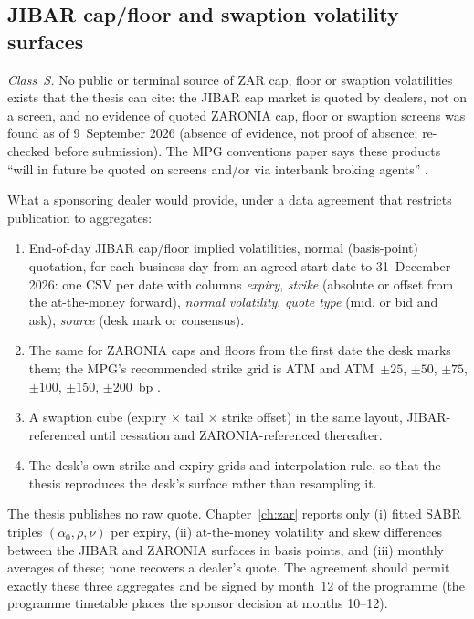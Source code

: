 
\subsection{JIBAR cap/floor and swaption volatility surfaces}\label{sec:appC-vols}

\emph{Class~S.} No public or terminal source of ZAR cap, floor or swaption volatilities exists that the thesis can cite: the JIBAR cap market is quoted by dealers, not on a screen, and no evidence of quoted ZARONIA cap, floor or swaption screens was found as of 9~September 2026 (absence of evidence, not proof of absence; re-checked before submission). The MPG conventions paper says these products ``will in future be quoted on screens and/or via interbank broking agents'' \citep[\S3, p.~5]{sarb2024conv}.

What a sponsoring dealer would provide, under a data agreement that restricts publication to aggregates:
\begin{enumerate}[nosep]
\item End-of-day JIBAR cap/floor implied volatilities, normal (basis-point) quotation, for each business day from an agreed start date to 31~December 2026: one CSV per date with columns \emph{expiry}, \emph{strike} (absolute or offset from the at-the-money forward), \emph{normal volatility}, \emph{quote type} (mid, or bid and ask), \emph{source} (desk mark or consensus).
\item The same for ZARONIA caps and floors from the first date the desk marks them; the MPG's recommended strike grid is ATM and ATM~$\pm25$, $\pm50$, $\pm75$, $\pm100$, $\pm150$, $\pm200$~bp \citep[\S7.6, p.~25]{sarb2024conv}.
\item A swaption cube (expiry $\times$ tail $\times$ strike offset) in the same layout, JIBAR-referenced until cessation and ZARONIA-referenced thereafter.
\item The desk's own strike and expiry grids and interpolation rule, so that the thesis reproduces the desk's surface rather than resampling it.
\end{enumerate}
The thesis publishes no raw quote. Chapter~\ref{ch:zar} reports only (i) fitted SABR triples $(\alpha_0,\rho,\nu)$ per expiry, (ii) at-the-money volatility and skew differences between the JIBAR and ZARONIA surfaces in basis points, and (iii) monthly averages of these; none recovers a dealer's quote. The agreement should permit exactly these three aggregates and be signed by month~12 of the programme (the programme timetable places the sponsor decision at months 10--12).

